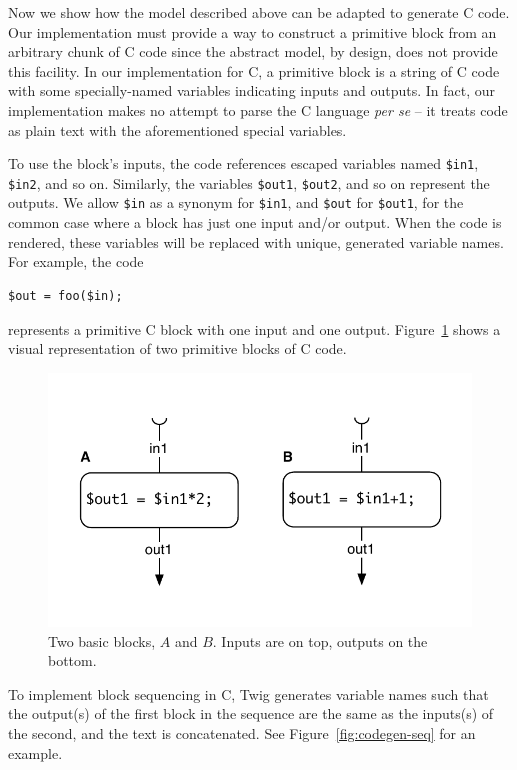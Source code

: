 Now we show how the model described above can be adapted to
generate C code. Our implementation must provide a way to
construct a primitive block from an arbitrary chunk of C code
since the abstract model, by design, does not provide this
facility. In our implementation for C, a primitive block is a
string of C code with some specially-named variables indicating
inputs and outputs. In fact, our implementation makes no attempt
to parse the C language \emph{per se} -- it treats code as plain
text with the aforementioned special variables.

To use the block's inputs, the code references escaped variables
named \texttt{\$in1}, \texttt{\$in2}, and so on. Similarly, the
variables \texttt{\$out1}, \texttt{\$out2}, and so on represent
the outputs. We allow \texttt{\$in} as a synonym for
\texttt{\$in1}, and \texttt{\$out} for \texttt{\$out1}, for the
common case where a block has just one input and/or output. When
the code is rendered, these variables will be replaced with
unique, generated variable names. For example, the code

\begin{verbatim}
$out = foo($in);
\end{verbatim}

represents a primitive C block with one input and one output.
Figure~\ref{fig:blocks} shows a visual representation of two
primitive blocks of C code.

\begin{figure}[ht]
\centering
\includegraphics[width=0.75\columnwidth]{images/code-gen1}
\caption{Two basic blocks, $A$ and $B$. Inputs are on top, outputs 
on the bottom.}
\label{fig:blocks}
\end{figure}

To implement block sequencing in C, Twig generates variable names
such that the output(s) of the first block in the sequence are the
same as the inputs(s) of the second, and the text is concatenated.
See Figure~\ref{fig:codegen-seq} for an example.

